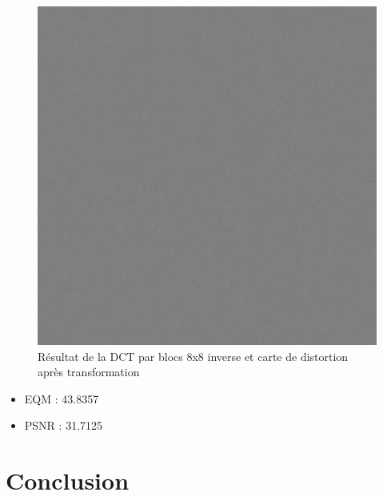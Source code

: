 \documentclass[12pt]{report}
\begin{document}
\begin{figure}[H]
\begin{center}
\includegraphics[scale=0.4]{../ImageRes/blockidct_transform_disto.jpg} 
\caption{Résultat de la DCT par blocs 8x8 inverse et carte de distortion après transformation}
\end{center}
\end{figure}

\begin{itemize}
\item EQM : 43.8357
\item PSNR : 31.7125
\end{itemize}

\section{Conclusion}

\newpage



\renewcommand*\listfigurename{\large Liste des figures}
\listoffigures
\newpage
\end{document}
